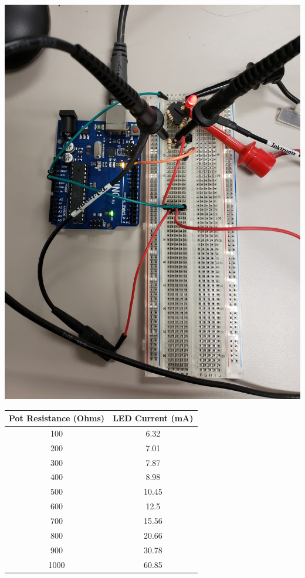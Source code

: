\documentclass[12pt]{article}
\begin{document}
				\begin{center}
					\includegraphics[scale=0.05]{potentiometer.jpg}\\
				\end{center}

				\begin{center}
					\begin{tabular}{|c | c |}
						\hline
						Pot Resistance (Ohms) & LED Current (mA)\\
						\hline
						100 & 6.32 \\
						200 & 7.01 \\
						300 & 7.87 \\
						400 & 8.98 \\
						500 & 10.45 \\
						600 & 12.5 \\
						700 & 15.56 \\
						800 & 20.66 \\
						900 & 30.78 \\
						1000 & 60.85 \\
						\hline
					\end{tabular}
				\end{center}
			
\end{document}
